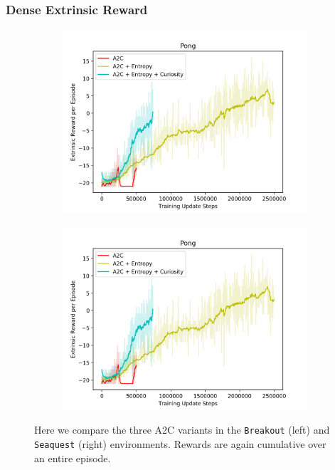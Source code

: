 \documentclass{article}
\begin{document}
\subsubsection{Dense Extrinsic Reward}
\begin{figure}[ht]
\centering
\begin{subfigure}{.5\textwidth}
  \centering
  \includegraphics[width=1.\linewidth]{figures/pong_rewards}
\end{subfigure}%
\begin{subfigure}{.5\textwidth}
  \centering
  \includegraphics[width=1.\linewidth]{figures/pong_rewards}
\end{subfigure}
\caption{Here we compare the three A2C variants in the \texttt{Breakout} (left) and \texttt{Seaquest} (right) environments. Rewards are again cumulative over an entire episode.}
\label{fig:seaquest-breakout-reward}
\end{figure}
\end{document}
